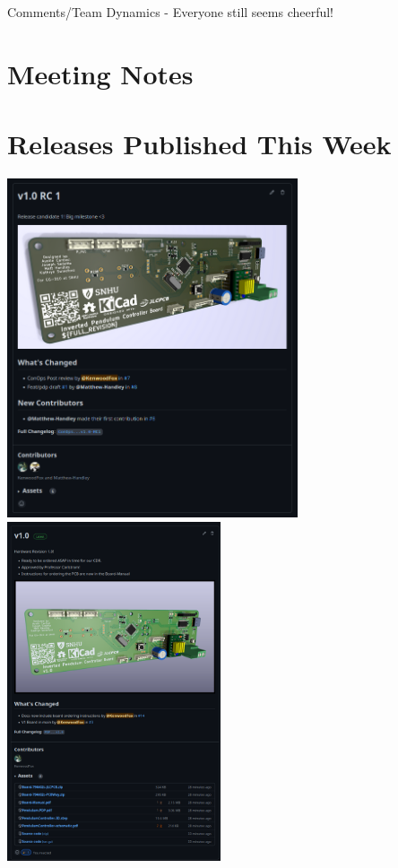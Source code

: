 \documentclass{scrartcl}
\begin{document}
\begin{defi}{Comments/Team Dynamics}{}
    - Everyone still seems cheerful!
\end{defi}


\pagebreak
\section{Meeting Notes}


\pagebreak
\section{Releases Published This Week}

\includegraphics[height=10cm]{v1.0 RC 1}
\includegraphics[height=10cm]{v1.0}
\end{document}
